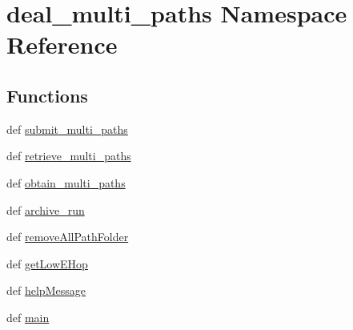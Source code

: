 \hypertarget{namespacedeal__multi__paths}{\section{deal\-\_\-multi\-\_\-paths Namespace Reference}
\label{namespacedeal__multi__paths}
}
\subsection*{Functions}
\begin{DoxyCompactItemize}
\item 
def \hyperlink{namespacedeal__multi__paths_ad02a4c8b40400b076949877c19b27e1d}{submit\-\_\-multi\-\_\-paths}
\item 
def \hyperlink{namespacedeal__multi__paths_aa9a3dd57cac0045b39c2cfec39304677}{retrieve\-\_\-multi\-\_\-paths}
\item 
def \hyperlink{namespacedeal__multi__paths_a40a1389fa399c358acba39b25ed63023}{obtain\-\_\-multi\-\_\-paths}
\item 
def \hyperlink{namespacedeal__multi__paths_afde870e8a0d4a40be61f588440595f16}{archive\-\_\-run}
\item 
def \hyperlink{namespacedeal__multi__paths_abe9dcb1a2bea2dac7b7cd1aeeae8d885}{remove\-All\-Path\-Folder}
\item 
def \hyperlink{namespacedeal__multi__paths_a4c2a4602508c3be74c939048a10400f3}{get\-Low\-E\-Hop}
\item 
def \hyperlink{namespacedeal__multi__paths_ac598d03cdc0b4d0ce0ecb2506d322b84}{help\-Message}
\item 
def \hyperlink{namespacedeal__multi__paths_a00cdab2da4710fbdae4d77afbc937151}{main}
\end{DoxyCompactItemize}


